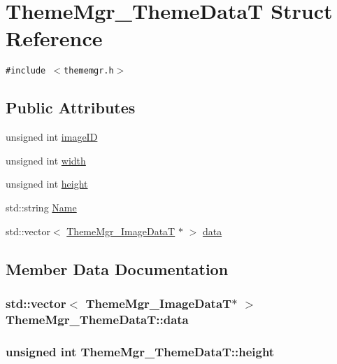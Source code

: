 \hypertarget{struct_theme_mgr___theme_data_t}{
\section{ThemeMgr\_\-ThemeDataT Struct Reference}
\label{struct_theme_mgr___theme_data_t}
}
{\tt \#include $<$thememgr.h$>$}

\subsection*{Public Attributes}
\begin{CompactItemize}
\item 
unsigned int \hyperlink{struct_theme_mgr___theme_data_t_9595a69b11a056d1bb0b807335bc1a8f}{imageID}
\item 
unsigned int \hyperlink{struct_theme_mgr___theme_data_t_178e885bbcb6aff2623c72739b130cb8}{width}
\item 
unsigned int \hyperlink{struct_theme_mgr___theme_data_t_1fedbd7ac9e454558443ada8f1fd0c7c}{height}
\item 
std::string \hyperlink{struct_theme_mgr___theme_data_t_9de4d61590462a57142505e40ea55f62}{Name}
\item 
std::vector$<$ \hyperlink{struct_theme_mgr___image_data_t}{ThemeMgr\_\-ImageDataT} $\ast$ $>$ \hyperlink{struct_theme_mgr___theme_data_t_f92438e127762486fb162fce559187f7}{data}
\end{CompactItemize}


\subsection{Member Data Documentation}
\hypertarget{struct_theme_mgr___theme_data_t_f92438e127762486fb162fce559187f7}{
\subsubsection[{data}]{\setlength{\rightskip}{0pt plus 5cm}std::vector$<$ {\bf ThemeMgr\_\-ImageDataT}$\ast$ $>$ {\bf ThemeMgr\_\-ThemeDataT::data}}}
\label{struct_theme_mgr___theme_data_t_f92438e127762486fb162fce559187f7}


\hypertarget{struct_theme_mgr___theme_data_t_1fedbd7ac9e454558443ada8f1fd0c7c}{
\subsubsection[{height}]{\setlength{\rightskip}{0pt plus 5cm}unsigned int {\bf ThemeMgr\_\-ThemeDataT::height}}}
\label{struct_theme_mgr___theme_data_t_1fedbd7ac9e454558443ada8f1fd0c7c}


